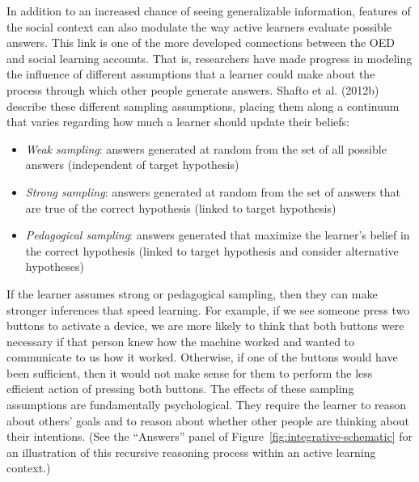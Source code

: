 \documentclass[oneside]{report}
\begin{document}
In addition to an increased chance of seeing generalizable information,
features of the social context can also modulate the way active learners
evaluate possible answers. This link is one of the more developed
connections between the OED and social learning accounts. That is,
researchers have made progress in modeling the influence of different
assumptions that a learner could make about the process through which
other people generate answers. Shafto et al. (2012b) describe these
different sampling assumptions, placing them along a continuum that
varies regarding how much a learner should update their beliefs:
\begin{itemize}
\tightlist
\item
  \emph{Weak sampling}: answers generated at random from the set of all
  possible answers (independent of target hypothesis)
\item
  \emph{Strong sampling}: answers generated at random from the set of
  answers that are true of the correct hypothesis (linked to target
  hypothesis)
\item
  \emph{Pedagogical sampling}: answers generated that maximize the
  learner's belief in the correct hypothesis (linked to target
  hypothesis and consider alternative hypotheses)
\end{itemize}
\noindent
If the learner assumes strong or pedagogical sampling, then they can
make stronger inferences that speed learning. For example, if we see
someone press two buttons to activate a device, we are more likely to
think that both buttons were necessary if that person knew how the
machine worked and wanted to communicate to us how it worked. Otherwise,
if one of the buttons would have been sufficient, then it would not make
sense for them to perform the less efficient action of pressing both
buttons. The effects of these sampling assumptions are fundamentally
psychological. They require the learner to reason about others' goals
and to reason about whether other people are thinking about their
intentions. (See the ``Answers'' panel of
Figure~\ref{fig:integrative-schematic} for an illustration of this
recursive reasoning process within an active learning context.)
\end{document}

